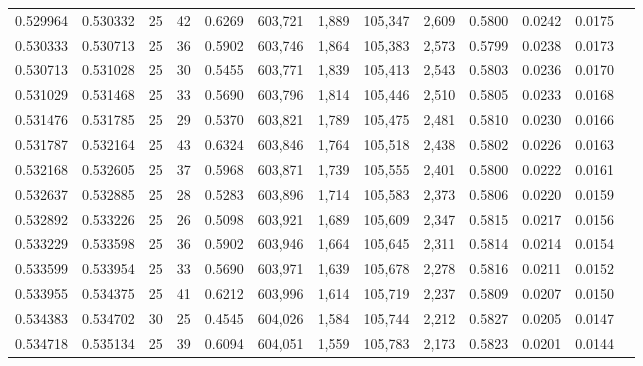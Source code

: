 \begin{tabular}{rrrrrrrrrrrrr}
0.529964 & 0.530332 &    25 &  42 &                                     0.6269 & 603,721 &   1,889 & 105,347 &   2,609 & 0.5800 & 0.0242 & 0.0175 \\
0.530333 & 0.530713 &    25 &  36 &                                     0.5902 & 603,746 &   1,864 & 105,383 &   2,573 & 0.5799 & 0.0238 & 0.0173 \\
0.530713 & 0.531028 &    25 &  30 &                                     0.5455 & 603,771 &   1,839 & 105,413 &   2,543 & 0.5803 & 0.0236 & 0.0170 \\
0.531029 & 0.531468 &    25 &  33 &                                     0.5690 & 603,796 &   1,814 & 105,446 &   2,510 & 0.5805 & 0.0233 & 0.0168 \\
0.531476 & 0.531785 &    25 &  29 &                                     0.5370 & 603,821 &   1,789 & 105,475 &   2,481 & 0.5810 & 0.0230 & 0.0166 \\
0.531787 & 0.532164 &    25 &  43 &                                     0.6324 & 603,846 &   1,764 & 105,518 &   2,438 & 0.5802 & 0.0226 & 0.0163 \\
0.532168 & 0.532605 &    25 &  37 &                                     0.5968 & 603,871 &   1,739 & 105,555 &   2,401 & 0.5800 & 0.0222 & 0.0161 \\
0.532637 & 0.532885 &    25 &  28 &                                     0.5283 & 603,896 &   1,714 & 105,583 &   2,373 & 0.5806 & 0.0220 & 0.0159 \\
0.532892 & 0.533226 &    25 &  26 &                                     0.5098 & 603,921 &   1,689 & 105,609 &   2,347 & 0.5815 & 0.0217 & 0.0156 \\
0.533229 & 0.533598 &    25 &  36 &                                     0.5902 & 603,946 &   1,664 & 105,645 &   2,311 & 0.5814 & 0.0214 & 0.0154 \\
0.533599 & 0.533954 &    25 &  33 &                                     0.5690 & 603,971 &   1,639 & 105,678 &   2,278 & 0.5816 & 0.0211 & 0.0152 \\
0.533955 & 0.534375 &    25 &  41 &                                     0.6212 & 603,996 &   1,614 & 105,719 &   2,237 & 0.5809 & 0.0207 & 0.0150 \\
0.534383 & 0.534702 &    30 &  25 &                                     0.4545 & 604,026 &   1,584 & 105,744 &   2,212 & 0.5827 & 0.0205 & 0.0147 \\
0.534718 & 0.535134 &    25 &  39 &                                     0.6094 & 604,051 &   1,559 & 105,783 &   2,173 & 0.5823 & 0.0201 & 0.0144 \\

\end{tabular}
